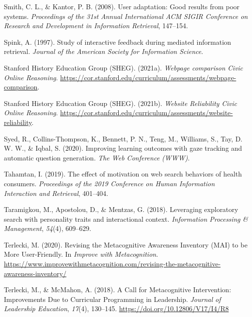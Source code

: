 \documentclass[letterpaper, nobind]{templates/ociamthesis}
\newlength{\cslhangindent}
\newenvironment{CSLReferences}[2] %
 {%
  \setlength{\parindent}{0pt}
  \ifodd #1
  \let\oldpar\par
  \def\par{\hangindent=\cslhangindent\oldpar}
  \fi
  \setlength{\parskip}{1mm}
  \setlength{\baselineskip}{6mm}
 }%
 {}
\begin{document}
\begin{CSLReferences}{1}{0}
\leavevmode{}%
Smith, C. L., \& Kantor, P. B. (2008). User adaptation: Good results from poor systems. \emph{Proceedings of the 31st Annual International ACM SIGIR Conference on Research and Development in Information Retrieval}, 147--154.

\leavevmode{}%
Spink, A. (1997). Study of interactive feedback during mediated information retrieval. \emph{Journal of the American Society for Information Science}.

\leavevmode{}%
Stanford History Education Group (SHEG). (2021a). \emph{Webpage comparison \textbar{} {Civic Online Reasoning}}. \url{https://cor.stanford.edu/curriculum/assessments/webpage-comparison}.

\leavevmode{}%
Stanford History Education Group (SHEG). (2021b). \emph{Website {Reliability} \textbar{} {Civic Online Reasoning}}. \url{https://cor.stanford.edu/curriculum/assessments/website-reliability}.

\leavevmode{}%
Syed, R., Collins-Thompson, K., Bennett, P. N., Teng, M., Williams, S., Tay, D. W. W., \& Iqbal, S. (2020). Improving learning outcomes with gaze tracking and automatic question generation. \emph{The Web Conference (WWW)}.

\leavevmode{}%
Tahamtan, I. (2019). The effect of motivation on web search behaviors of health consumers. \emph{Proceedings of the 2019 Conference on Human Information Interaction and Retrieval}, 401--404.

\leavevmode{}%
Taramigkou, M., Apostolou, D., \& Mentzas, G. (2018). Leveraging exploratory search with personality traits and interactional context. \emph{Information Processing \& Management}, \emph{54}(4), 609--629.

\leavevmode{}%
Terlecki, M. (2020). Revising the {Metacognitive Awareness Inventory} ({MAI}) to be {More User}-{Friendly}. In \emph{Improve with Metacognition}. \url{https://www.improvewithmetacognition.com/revising-the-metacognitive-awareness-inventory/}

\leavevmode{}%
Terlecki, M., \& McMahon, A. (2018). A {Call} for {Metacognitive Intervention}: Improvements {Due} to {Curricular Programming} in {Leadership}. \emph{Journal of Leadership Education}, \emph{17}(4), 130--145. \url{https://doi.org/10.12806/V17/I4/R8}


\end{CSLReferences}
\end{document}
